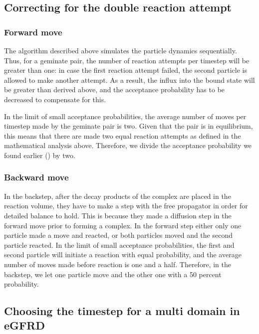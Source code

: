 \subsection{Correcting for the double reaction attempt}

\subsubsection{Forward move}
The algorithm described above simulates the particle dynamics sequentially. Thus, for a geminate pair, the number of reaction attempts per timestep will be greater than one: in case the first reaction attempt failed, the second particle is allowed to make another attempt. As a result, the influx into the bound state will be greater than derived above, and the acceptance probability has to be decreased to compensate for this. 

In the limit of small acceptance probabilities, the average number of moves per timestep made by the geminate pair is two. Given that the pair is in equilibrium, this means that there are made two equal reaction attempts as defined in the mathematical analysis above. Therefore, we divide the acceptance probability we found earlier () by two.

\subsubsection{Backward move}
In the backstep, after the decay products of the complex are placed in the reaction volume, they have to make a step with the free propagator in order for detailed balance to hold. This is because they made a diffusion step in the forward move prior to forming a complex. In the forward step either only one particle made a move and reacted, or both particles moved and the second particle reacted. In the limit of small acceptance probabilities, the first and second particle will initiate a reaction with equal probability, and the average number of moves made before reaction is one and a half. Therefore, in the backstep, we let one particle move and the other one with a 50 percent probability.


\subsection{Choosing the timestep for a multi domain in eGFRD}

